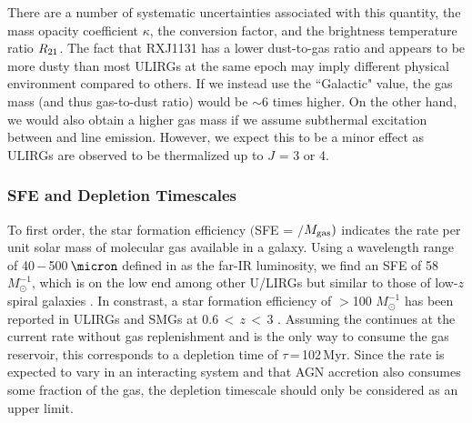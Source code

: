 \documentclass[]{emulateapj}
\begin{document}
There are a number of systematic uncertainties associated with this quantity, \eg
the mass opacity coefficient $\kappa$,
the \alphaco conversion factor, and the brightness temperature ratio $R_{\rm 21}$.
The fact that RXJ1131 has a lower dust-to-gas ratio 
and appears to be more dusty than most ULIRGs at the same epoch
may imply different physical
environment compared to others. If we instead use the ``Galactic" \alphaco value, 
the gas mass (and thus gas-to-dust ratio) would be $\sim$6 times higher.
On the other hand, we would also obtain a higher gas mass if 
we assume subthermal excitation between \bco and \aco line emission.
However, we expect this to be a minor effect as ULIRGs are observed to be
thermalized up to $J$ = 3 or 4.

\subsubsection{SFE and Depletion Timescales}



To first order, the star formation efficiency
$($SFE = \LFIR$/$$M_{\rm gas})$
indicates the \SF rate per
unit solar mass of molecular gas available in a galaxy.
Using a wavelength range of 40\,$-$\,500\,$\micron$ defined
in  as the far-IR luminosity,
we find an SFE of 58 \Lsun $M_{\odot}^{-1}$,
which is on the low end among other U/LIRGs
\citep{Solomon97a, Combes11a}
but 
similar to those of
low-$z$ spiral galaxies .
In constrast, a star formation efficiency of $>$100 \Lsun $M_{\odot}^{-1}$
has been reported in ULIRGs and SMGs at 0.6\,$<$\,$z$\,$<$\,3
\citep[][]{Tacconi08a}.
Assuming the \SF continues at the current rate without gas replenishment and is the only
way to consume the gas reservoir, this corresponds to a depletion
time of $\tau$\,=\,102\,Myr.
Since the \SF rate is expected to vary in an interacting system and that AGN accretion
also consumes some fraction of the gas, the depletion
timescale should only be considered as an upper limit.
\end{document}
